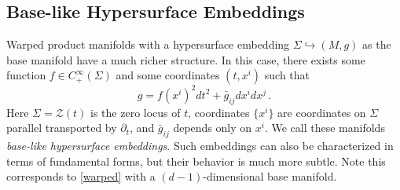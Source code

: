 \documentclass[a4paper,10.9pt]{amsart}
\theoremstyle{definition}
\theoremstyle{remark}
\numberwithin{equation}{section}
\renewcommand{\=}{\stackrel \Sigma =}
\begin{document}
\subsection{Base-like Hypersurface Embeddings} \label{base}

Warped product manifolds with a hypersurface embedding $\Sigma \hookrightarrow (M,g)$ as the base manifold have a much richer structure. In this case, there exists some function $f \in C^\infty_+ (\Sigma)$ and some coordinates $(t,x^i)$ such that
$$g = f(x^i)^2 dt^2 + \bar{g}_{ij} dx^i dx^j\,.$$
Here $\Sigma = \mathcal{Z}(t)$ is the zero locus of $t$,
coordinates $\{x^i\}$ are coordinates on $\Sigma$ parallel transported by $\partial_t$, and $\bar{g}_{ij}$ 
depends only on $x^i$.
We call these manifolds \textit{base-like hypersurface embeddings}. Such embeddings can also be characterized in terms of fundamental forms, but their behavior is much more subtle. Note this corresponds to  \eqref{warped} with  a $(d-1)$-dimensional base manifold.
\end{document}
